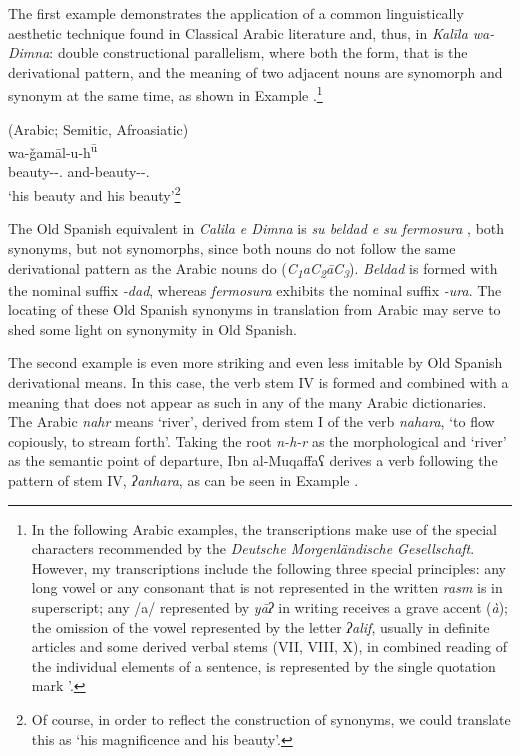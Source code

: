 \documentclass[output=paper]{langscibook}
\begin{document}
The first example demonstrates the application of a common linguistically aesthetic technique found in Classical Arabic literature and, thus, in \textit{Kalīla wa-Dimna}: double constructional parallelism, where both the form, that is the derivational pattern, and the meaning of two adjacent nouns are synomorph and synonym at the same time, as shown in Example .\footnote{In the following Arabic examples, the transcriptions make use of the special characters recommended by the \textit{Deutsche Morgenländische Gesellschaft}. However, my transcriptions include the following three special principles: any long vowel or any consonant that is not represented in the written \textit{rasm} is in superscript; any /a/ represented by \textit{yāʔ} in writing receives a grave accent (\textit{à}); the omission of the vowel represented by the letter \textit{ʔalif}, usually in definite articles and some derived verbal stems (VII, VIII, X), in combined reading of the individual elements of a sentence, is represented by the single quotation mark '.}

\begin{exe}
    \ex\label{doehla:ex:1} (Arabic; Semitic, Afroasiatic) \\
     {wa-ǧamāl-u-h\textsuperscript{ū}} \\
    beauty-\NOM-\POSS.\Third\SG{} and-beauty-\NOM-\POSS.\Third\SG{} \\
    \glt ‘his beauty and his beauty’\footnote{Of course, in order to reflect the construction of synonyms, we could translate this as ‘his magnificence and his beauty’.}
\end{exe}


The Old Spanish equivalent in \textit{Calila e Dimna} is \textit{su beldad e su fermosura} \citep[AI.31e]{dohla_libro_2009}, both synonyms, but not synomorphs, since both nouns do not follow the same derivational pattern as the Arabic nouns do (\textit{C\textsubscript{1}aC\textsubscript{2}āC\textsubscript{3}}). \textit{Beldad} is formed with the nominal suffix \textit{-dad}, whereas \textit{fermosura} exhibits the nominal suffix \textit{-ura}. The locating of these Old Spanish synonyms in translation from Arabic may serve to shed some light on synonymity in Old Spanish. 

The second example is even more striking and even less imitable by Old Spanish derivational means. In this case, the verb stem IV is formed and combined with a meaning that does not appear as such in any of the many Arabic dictionaries. The Arabic \textit{nahr} means ‘river’, derived from stem I of the verb \textit{nahara}, ‘to flow copiously, to stream forth’. Taking the root \textit{n-h-r} as the morphological and ‘river’ as the semantic point of departure, Ibn al-Muqaffaʕ derives a verb following the pattern of stem IV, \textit{ʔanhara}, as can be seen in Example .
\end{document}
